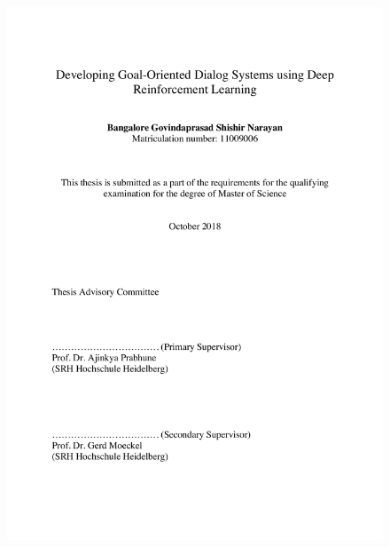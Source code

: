 \documentclass[12pt]{extarticle}
\date{}
\title{}
\numberwithin{equation}{section}
\begin{document}
	\thispagestyle{empty}
	\begin{titlepage}
	\centering
	\maketitle
\end{titlepage}
\thispagestyle{empty}
\clearpage

		\begin{figure}[H]
			\centering
		\includegraphics[scale=1]{cover2}
			\label{cover2}
	\end{figure}
	\restoregeometry
	\clearpage
	
	
	
\end{document}

